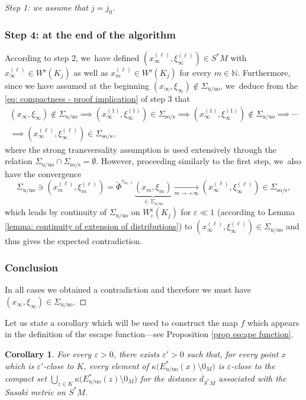 \documentclass[JEP,XML,SOM,Unicode,NoEqCountersInSection,NoFloatCountersInSection,published]{cedram}
\newcommand{\rs}{\mathrm{s}}
\newcommand{\rso}{\mathrm{so}}
\newcommand{\ru}{\mathrm{u}}
\newcommand{\ruo}{\mathrm{uo}}
\theoremstyle{definition}
\theoremstyle{plain}
\newtheorem{corollary}[definition]{Corollary}
\newcommand{\N}{\mathbb{N}}
\begin{document}
\begin{proof}[Step 1: we assume that $j = j_0$]
\subsubsection*{Step 4: at the end of the algorithm}
According to step 2, we~have defined $(x_{\infty}^{(\ell)}, \xi_{\infty}^{(\ell)}) \in S^*M$ with $x_{\infty}^{(\ell)} \in W^\rs (K_j)$ as well as $x_{m}^{(\ell)} \in W^\rs (K_j)$ for every $m \in \N$. Furthermore, since we have assumed at the beginning $(x_{\infty},\xi_{\infty}) \notin \Sigma_{\ru/\ruo}$, we~deduce from the \eqref{eq: compactness - proof implication} of step 3 that\vspace*{-5pt}
\begin{multline*}
(x_{\infty},\xi_{\infty}) \notin \Sigma_{\ru/\ruo} \implies (x_{\infty}^{(1)}, \xi_{\infty}^{(1)}) \in \Sigma_{\rso/\rs} \implies (x_{\infty}^{(1)}, \xi_{\infty}^{(1)}) \notin \Sigma_{\ru/\ruo} \implies \cdots \\
\implies (x_{\infty}^{(\ell)}, \xi_{\infty}^{(\ell)}) \in \Sigma_{\rso/\rs},
\end{multline*}
where the strong transversality assumption is used extensively through the relation $\Sigma_{\ru/\ruo} \cap \Sigma_{\rso/\rs} = \emptyset$. However, proceeding similarly to the first step, we~also have the convergence\vspace*{-3pt}\enlargethispage{.5\baselineskip}
\[
\Sigma_{\ru/\ruo} \ni (x_m^{(\ell)},\xi_m^{(\ell)}) = \widetilde{\Phi}^{\tau_{m,\ell}} \underbrace{(x_m,\xi_m)}_{\in \Sigma_{\ru/\ruo}} \underset{m \to +\infty}{\to} (x_{\infty}^{(\ell)}, \xi_{\infty}^{(\ell)}) \in \Sigma_{\rso/\rs},
\]
which leads by continuity of $\Sigma_{\ru/\ruo}$ on $W_{\varepsilon}^\rs (K_j)$ for $\varepsilon \ll 1$ (according to Lemma \ref{lemma: continuity of extension of distributions}) to $(x_{\infty}^{(\ell)}, \xi_{\infty}^{(\ell)}) \in \Sigma_{\ru/\ruo}$ and thus gives the expected contradiction.

\subsubsection*{Conclusion}
In all cases we obtained a contradiction and therefore we must have $(x_{\infty},\xi_{\infty}) \in \Sigma_{\ru/\ruo}$.
\end{proof}

Let us state a corollary which will be used to construct the map $f$ which appears in the definition of the escape function---see Proposition \ref{prop escape function}.

\begin{corollary}\label{Corollary compactness proposition}
For every $\varepsilon > 0$, there exists $\varepsilon' > 0$ such that, for every point $x$ which is $\varepsilon'$-close to $K$, every element of $\kappa \bigl(E_{\ru/\ruo}^* (x) \setminus 0_M\bigr)$ is $\varepsilon$-close to the compact set $\bigcup_{z \in K} \kappa\bigl(E_{\ru/\ruo}^* (z)\setminus 0_M \bigr)$ for the distance $d_{S^*M}$ associated with the Sasaki metric on $S^*M$.
\end{corollary}
\end{document}
